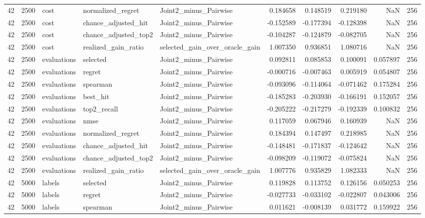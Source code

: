 \begin{tabular}{rrlllrrrrr}
42 & 2500 & cost & normalized_regret & Joint2_minus_Pairwise & 0.184658 & 0.148519 & 0.219180 & NaN & 256 \\
42 & 2500 & cost & chance_adjusted_hit & Joint2_minus_Pairwise & -0.152589 & -0.177394 & -0.128398 & NaN & 256 \\
42 & 2500 & cost & chance_adjusted_top2 & Joint2_minus_Pairwise & -0.104287 & -0.124879 & -0.082705 & NaN & 256 \\
42 & 2500 & cost & realized_gain_ratio & selected_gain_over_oracle_gain & 1.007350 & 0.936851 & 1.080716 & NaN & 256 \\
42 & 2500 & evaluations & selected & Joint2_minus_Pairwise & 0.092811 & 0.085853 & 0.100091 & 0.057897 & 256 \\
42 & 2500 & evaluations & regret & Joint2_minus_Pairwise & -0.000716 & -0.007463 & 0.005919 & 0.054807 & 256 \\
42 & 2500 & evaluations & spearman & Joint2_minus_Pairwise & -0.093096 & -0.114064 & -0.071462 & 0.175284 & 256 \\
42 & 2500 & evaluations & best_hit & Joint2_minus_Pairwise & -0.185283 & -0.203930 & -0.166191 & 0.152057 & 256 \\
42 & 2500 & evaluations & top2_recall & Joint2_minus_Pairwise & -0.205222 & -0.217279 & -0.192339 & 0.100832 & 256 \\
42 & 2500 & evaluations & nmse & Joint2_minus_Pairwise & 0.117059 & 0.067946 & 0.160939 & NaN & 256 \\
42 & 2500 & evaluations & normalized_regret & Joint2_minus_Pairwise & 0.184394 & 0.147497 & 0.218985 & NaN & 256 \\
42 & 2500 & evaluations & chance_adjusted_hit & Joint2_minus_Pairwise & -0.148481 & -0.171837 & -0.124642 & NaN & 256 \\
42 & 2500 & evaluations & chance_adjusted_top2 & Joint2_minus_Pairwise & -0.098209 & -0.119072 & -0.075824 & NaN & 256 \\
42 & 2500 & evaluations & realized_gain_ratio & selected_gain_over_oracle_gain & 1.007776 & 0.935829 & 1.082333 & NaN & 256 \\
42 & 5000 & labels & selected & Joint2_minus_Pairwise & 0.119828 & 0.113752 & 0.126156 & 0.050253 & 256 \\
42 & 5000 & labels & regret & Joint2_minus_Pairwise & -0.027733 & -0.033102 & -0.022807 & 0.043006 & 256 \\
42 & 5000 & labels & spearman & Joint2_minus_Pairwise & 0.011621 & -0.008139 & 0.031772 & 0.159922 & 256 \\

\end{tabular}

